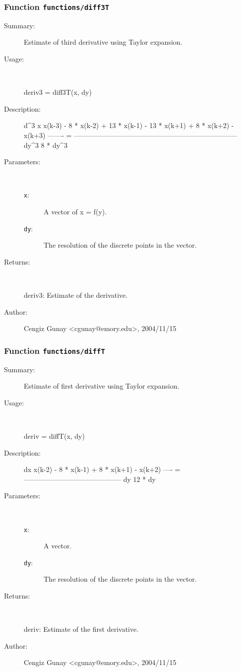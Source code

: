 \subsubsection[Function \texttt{diff3T}]{Function \texttt{functions/diff3T}}%
%
\label{ref_functions__diff3T}%
\hypertarget{ref_functions__diff3T}{}%
\begin{description}
\item[Summary:]Estimate of third derivative using Taylor expansion.
%
\item[Usage:]~%
\begin{lyxcode}%
deriv3 = diff3T(x, dy)
%
\end{lyxcode}%
%
\item[Description:]%
d\textasciicircum{}3 x     x(k-3) - 8 * x(k-2) + 13 * x(k-1) - 13 * x(k+1) + 8 * x(k+2) - x(k+3)
  ------- = -----------------------------------------------------------------------
   dy\textasciicircum{}3			        8 * dy\textasciicircum{}3
\item[Parameters:]~
\begin{description}%
\item[\texttt{x}:]
 A vector of x = f(y).
\item[\texttt{dy}:]
 The resolution of the discrete points in the vector.
\end{description}%
%
\item[Returns:]~

 	deriv3: Estimate of the derivative.
%
%
%
\item[Author:]%
Cengiz Gunay <cgunay@emory.edu>, 2004/11/15%
\end{description}
\methodline%
\subsubsection[Function \texttt{diffT}]{Function \texttt{functions/diffT}}%
%
\label{ref_functions__diffT}%
\hypertarget{ref_functions__diffT}{}%
\begin{description}
\item[Summary:]Estimate of first derivative using Taylor expansion.
%
\item[Usage:]~%
\begin{lyxcode}%
deriv = diffT(x, dy)
%
\end{lyxcode}%
%
\item[Description:]%
dx     x(k-2) - 8 * x(k-1) + 8 * x(k+1) - x(k+2)
  ---- = ------------------------------------------
   dy			12 * dy
\item[Parameters:]~
\begin{description}%
\item[\texttt{x}:]
 A vector.
\item[\texttt{dy}:]
 The resolution of the discrete points in the vector.
\end{description}%
%
\item[Returns:]~

 	deriv: Estimate of the first derivative.
%
%
%
\item[Author:]%
Cengiz Gunay <cgunay@emory.edu>, 2004/11/15%
\end{description}
\methodline%
